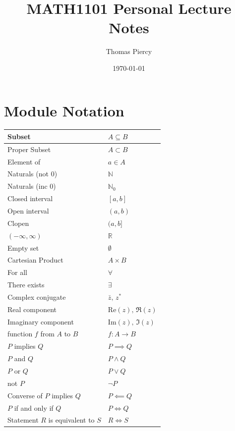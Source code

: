 \documentclass[12pt]{article}
\title{\textbf{MATH1101 Personal Lecture Notes}}
\author{Thomas Piercy}
\date{\today{}}
\begin{document}
\maketitle
\hrulefill
{}
\tableofcontents
\newpage
\section{Module Notation}
\begin{table}[H]
    \begin{tabular}{|l|l|}
        \hline
        Subset & \(A\subseteq B\)  \\ \hline
        Proper Subset & \(A\subset B\) \\ \hline
        Element of & \(a\in A\) \\ \hline
        Naturals (not 0) & \(\mathbb{N}\) \\ \hline
        Naturals (inc 0) & \(\mathbb{N}_0\)  \\ \hline
        Closed interval & \([a,b]\) \\ \hline
        Open interval & \((a,b)\) \\ \hline
        Clopen & \((a,b]\) \\ \hline
        \((-\infty,\infty)\) & \(\mathbb{R}\) \\ \hline
        Empty set & \(\emptyset\) \\ \hline
        Cartesian Product & \(A\times B\) \\ \hline
        For all & \(\forall\)  \\ \hline
        There exists & \(\exists\) \\ \hline
        Complex conjugate & \(\bar{z},\,z^*\)  \\ \hline
        Real component & \(\text{Re}(z),\,\Re(z)\) \\ \hline
        Imaginary component & \(\text{Im}(z),\,\Im(z)\) \\ \hline
        function \(f\) from \(A\) to \(B\) & \(f:A\to B\) \\ \hline
        \(P\) implies \(Q\) & \(P\implies Q\)  \\ \hline
        \(P\) and \(Q\) & \(P \land Q\) \\ \hline
        \(P\) or \(Q\) & \(P \lor Q\)  \\ \hline
        not \(P\) & \(\lnot P\) \\ \hline
        Converse of \(P\) implies \(Q\) & \(P\impliedby Q\) \\ \hline
        \(P\) if and only if \(Q\) & \(P\iff Q\) \\ \hline
        Statement \(R\) is equivalent to \(S\) & \(R\iff S\) \\ \hline
    \end{tabular}
\end{table}
\end{document}
